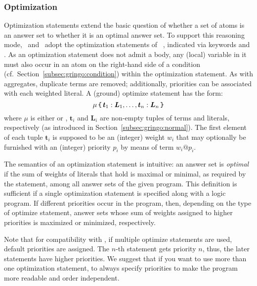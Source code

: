 
\subsubsection{Optimization}\label{subsec:gringo:optimize}

Optimization statements extend the basic question of
whether a set of atoms is an answer set to
whether it is an optimal answer set.
To support this reasoning mode, \gringo\ and \clingo\ adopt the
optimization statements of \lparse~\cite{lparseManual},
indicated via keywords  and .
As an optimization statement does not admit a body, any (local) variable
in it must also occur in an atom 
on the right-hand side of a condition (cf.\ Section~\ref{subsec:gringo:condition})
within the optimization statement.
As with aggregates, duplicate terms are removed;
additionally, priorities can be associated with each weighted literal.
A (ground) optimize statement has the form: 
%
%
\[
\mathsf{\mu}\,\texttt{\{}\,\boldsymbol{t}_1:\boldsymbol{L}_1,\dots,\boldsymbol{t}_n:\boldsymbol{L}_n\,\texttt{\}}
\] 
where $\mathsf{\mu}$ is either  or , 
$\boldsymbol{t}_i$ and $\boldsymbol{L}_i$ are non-empty tuples of terms and literals, respectively
(as introduced in Section~\ref{subsec:gringo:normal}).
The first element of each tuple $\boldsymbol{t}_i$ is supposed to be an (integer) weight $w_i$
that may optionally be furnished with an (integer) priority $p_i$ by means of term $w_i@p_i$.

The semantics of an optimization statement is intuitive:
an answer set is \emph{optimal} if the sum of weights
of literals that hold is maximal or minimal, as required by the statement,
among all answer sets of the given program.
This definition is sufficient if a single optimization statement is specified
along with a logic program.
If different priorities occur in the program, 
then, depending on the type of optimize statement,
answer sets whose sum of weights assigned to higher priorities
is maximized or minimized, respectively.

Note that for compatibility with \lparse, if multiple optimize statements are used, 
default priorities are assigned.
The $n$-th statement gets priority $n$, thus, the later statements have higher priorities.
We suggest that if you want to use more than one optimization statement,
to always specify priorities to make the program more readable and order independent.

